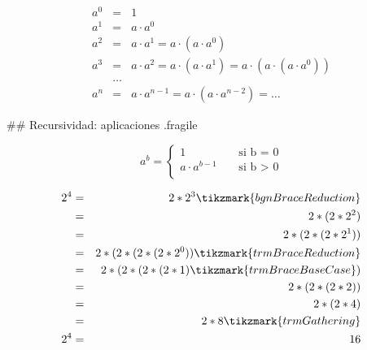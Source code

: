 \vspace{-1ex}
\begin{eqnarray*}
a^0 & = & 1 \\
a^1 & = & a \cdot a^0 \\
a^2 & = & a \cdot a^1 = a \cdot (a \cdot a^0) \\
a^3 & = & a \cdot a^2 = a \cdot (a \cdot a^1) = a \cdot (a \cdot (a \cdot a^0)) \\
    & \ldots & \\
a^n & = & a \cdot a^{n-1} = a \cdot (a \cdot a^{n-2}) = \ldots
\end{eqnarray*}


## Recursividad: aplicaciones {.fragile}


$$ a^b = \begin{cases}
        1               & \;\;\;\;\text{si b = 0} \\
        a \cdot a^{b-1} & \;\;\;\;\text{si b > 0} \\
    \end{cases}
$$

\vspace{-3ex}

\bgncolumns


\begin{footnotesize}
\begin{eqnarray*}
2^4 & = & 2 * 2^3 \tikzmark{bgnBraceReduction} \\
    & = & 2 * (2 * 2^2) \\
    & = & 2 * (2 * (2 * 2^1)) \\
    & = & 2 * (2 * (2 * (2 * 2^0)) \tikzmark{trmBraceReduction} \\
    & = & 2 * (2 * (2 * (2 * 1) \tikzmark{trmBraceBaseCase}) \\
    & = & 2 * (2 * (2 * 2)) \\
    & = & 2 * (2 * 4) \\
    & = & 2 * 8 \tikzmark{trmGathering} \\
2^4 & = & 16 \\
\end{eqnarray*}
\end{footnotesize}


\trmcolumns

    

